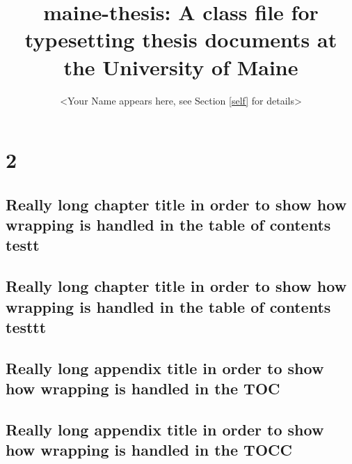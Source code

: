 \documentclass{maine-thesis}
\title{maine-thesis: A class file for typesetting thesis documents at the University of Maine}
\author{<Your Name appears here, see Section \ref{self} for details>}
\begin{document}
\preliminary
\titlepage




\part{2}
\tableofcontents
\listoftables



\chapter{Really long chapter title in order to show how wrapping is handled in the table of contents testt}
\chapter{Really long chapter title in order to show how wrapping is handled in the table of contents testtt}




\appendix


\chapter{Really long appendix title in order to show how wrapping is handled in the TOC}
\chapter{Really long appendix title in order to show how wrapping is handled in the TOCC}


\end{document}
